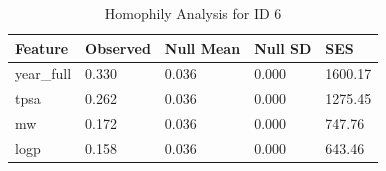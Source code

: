 \begin{table}
\caption{Homophily Analysis for ID 6}
\label{tab:homophily_id6}
\begin{tabular}{lllll}
\toprule
Feature & Observed & Null Mean & Null SD & SES \\
\midrule
year_full & 0.330 & 0.036 & 0.000 & 1600.17 \\
tpsa & 0.262 & 0.036 & 0.000 & 1275.45 \\
mw & 0.172 & 0.036 & 0.000 & 747.76 \\
logp & 0.158 & 0.036 & 0.000 & 643.46 \\
\bottomrule
\end{tabular}
\end{table}
